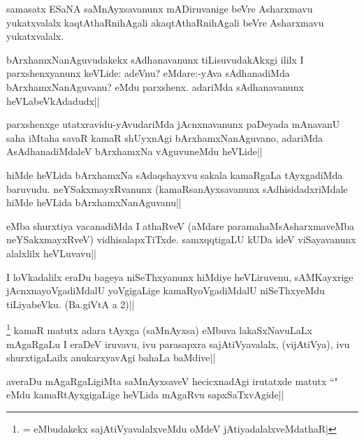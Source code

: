 \begin{artha}%
samasatx ESaNA saMnAyxsavanunx mADiruvanige beVre Asharxmavu yukatxvalalx kaqtAthaRnihAgali akaqtAthaRnihAgali beVre Asharxmavu yukatxvalalx.
\end{artha}

\begin{artha}
bArxhamxNanAguvudakekx sAdhanavanunx tiLisuvudakAkxgi ililx I parxshenxyanunx keVLide: adeVnu? eMdare:-yAva sAdhanadiMda bArxhamxNanAguvanu? eMdu parxshenx. adariMda sAdhanavanunx heVLabeVkAdadudx||
\end{artha}

\begin{artha}
parxshenxge utatxravidu-yAvudariMda jAcnxnavanunx paDeyada mAnavanU saha iMtaha savaR kamaR shUyxnAgi bArxhamxNanAguvano, adariMda AsAdhanadiMdaleV bArxhamxNa vAguvuneMdu heVLide||
\end{artha}

\begin{artha}
hiMde heVLida bArxhamxNa sAdaqshayxvu sakala kamaRgaLa tAyxgadiMda baruvudu. neYSakxmayxRvanunx (kamaRsanAyxsavanunx sAdhisidadxriMdale hiMde heVLida bArxhamxNanAguvanu||
\end{artha}

\begin{artha}
\stext eMba shurxtiya vacanadiMda I athaRveV (aMdare paramahaMsAsharxmaveMba neYSakxmayxRveV) vidhisalapxTiTxde. samxqqtigaLU kUDa ideV viSayavanunx alalxlilx heVLuvavu||
\end{artha}%


\begin{artha}
I loVkadalilx eraDu bageya niSeThxyanunx hiMdiye heVLiruvenu, sAMKayxrige jAcnxnayoVgadiMdalU yoVgigaLige kamaRyoVgadiMdalU niSeThxyeMdu tiLiyabeVku. (Ba.giVtA a 2)||
\end{artha}


\begin{artha}
\footnote[1]{\stext = eMbudakekx sajAtiVyavalalxveMdu oMdeV jAtiyadalalxveMdathaR|} kamaR matutx adara tAyxga (saMnAyxsa) eMbuva lakaSxNavuLaLx mAgaRgaLu I eraDeV iruvavu, ivu parasapxra sajAtiVyavalalx, (vijAtiVya), ivu shurxtigaLailx anukarxyavAgi bahaLa baMdive||
\end{artha}

\begin{artha}
averaDu mAgaRgaLigiMta saMnAyxsaveV hecicxnadAgi irutatxde matutx ``\stext " eMdu kamaRtAyxgigaLige heVLida mAgaRvu sapxSaTxvAgide||
\end{artha}

